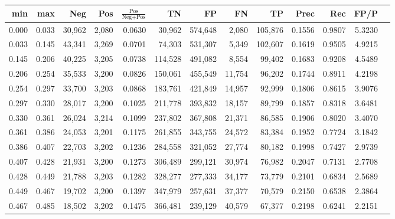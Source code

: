 \begin{tabular}{rrrrrrrrrrrrr}
\toprule
  min &   max &    Neg &   Pos & $\frac{\text{Pos}}{\text{Neg}+\text{Pos}}$ &      TN &      FP &      FN &      TP &   Prec &    Rec &   FP/P \\
\midrule
0.000 & 0.033 & 30,962 & 2,080 &                                     0.0630 &  30,962 & 574,648 &   2,080 & 105,876 & 0.1556 & 0.9807 & 5.3230 \\
0.033 & 0.145 & 43,341 & 3,269 &                                     0.0701 &  74,303 & 531,307 &   5,349 & 102,607 & 0.1619 & 0.9505 & 4.9215 \\
0.145 & 0.206 & 40,225 & 3,205 &                                     0.0738 & 114,528 & 491,082 &   8,554 &  99,402 & 0.1683 & 0.9208 & 4.5489 \\
0.206 & 0.254 & 35,533 & 3,200 &                                     0.0826 & 150,061 & 455,549 &  11,754 &  96,202 & 0.1744 & 0.8911 & 4.2198 \\
0.254 & 0.297 & 33,700 & 3,203 &                                     0.0868 & 183,761 & 421,849 &  14,957 &  92,999 & 0.1806 & 0.8615 & 3.9076 \\
0.297 & 0.330 & 28,017 & 3,200 &                                     0.1025 & 211,778 & 393,832 &  18,157 &  89,799 & 0.1857 & 0.8318 & 3.6481 \\
0.330 & 0.361 & 26,024 & 3,214 &                                     0.1099 & 237,802 & 367,808 &  21,371 &  86,585 & 0.1906 & 0.8020 & 3.4070 \\
0.361 & 0.386 & 24,053 & 3,201 &                                     0.1175 & 261,855 & 343,755 &  24,572 &  83,384 & 0.1952 & 0.7724 & 3.1842 \\
0.386 & 0.407 & 22,703 & 3,202 &                                     0.1236 & 284,558 & 321,052 &  27,774 &  80,182 & 0.1998 & 0.7427 & 2.9739 \\
0.407 & 0.428 & 21,931 & 3,200 &                                     0.1273 & 306,489 & 299,121 &  30,974 &  76,982 & 0.2047 & 0.7131 & 2.7708 \\
0.428 & 0.449 & 21,788 & 3,203 &                                     0.1282 & 328,277 & 277,333 &  34,177 &  73,779 & 0.2101 & 0.6834 & 2.5689 \\
0.449 & 0.467 & 19,702 & 3,200 &                                     0.1397 & 347,979 & 257,631 &  37,377 &  70,579 & 0.2150 & 0.6538 & 2.3864 \\
0.467 & 0.485 & 18,502 & 3,202 &                                     0.1475 & 366,481 & 239,129 &  40,579 &  67,377 & 0.2198 & 0.6241 & 2.2151 \\

\end{tabular}
